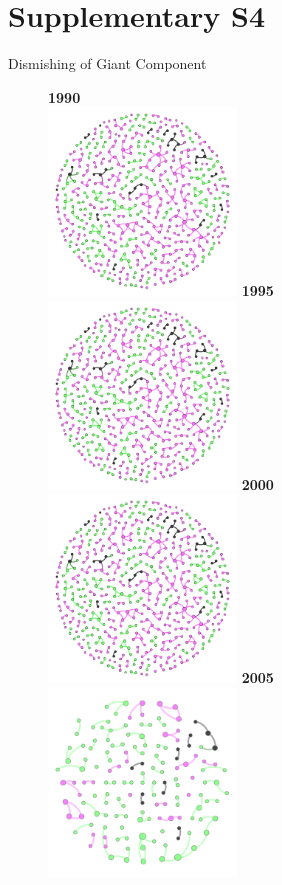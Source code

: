 \documentclass[10pt]{article}         %
\begin{document}
\newpage
\section{Supplementary S4}
Dismishing of Giant Component\\
\begin{figure}[!htb]
  \textbf{1990}\\
  \includegraphics[width=5cm, height=5cm]{S41990.png}
\endminipage\hfill
{}
  \textbf{1995}\\
  \includegraphics[width=5cm, height=5cm]{S41995.png}
\endminipage\hfill
{}%
  \textbf{2000}\\
  \includegraphics[width=5cm, height=5cm]{S42000.png}
\endminipage\hfill
{}
  \textbf{2005}\\
  \includegraphics[width=5cm, height=5cm]{S42005.png}

\end{figure}
\end{document}
